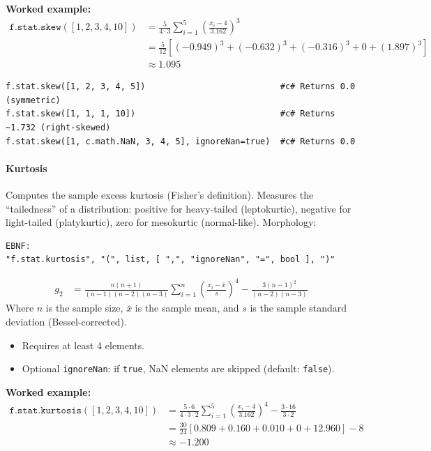 \textbf{Worked example:}
\begin{align*}
\texttt{f.stat.skew}([1, 2, 3, 4, 10]) &= \frac{5}{4 \cdot 3} \sum_{i=1}^{5} \left( \frac{x_i - 4}{3.162} \right)^3 \\
&= \frac{5}{12} \left[ (-0.949)^3 + (-0.632)^3 + (-0.316)^3 + 0 + (1.897)^3 \right] \\
&\approx 1.095
\end{align*}

\begin{verbatim}
f.stat.skew([1, 2, 3, 4, 5])                           #c# Returns 0.0 (symmetric)
f.stat.skew([1, 1, 1, 10])                             #c# Returns ~1.732 (right-skewed)
f.stat.skew([1, c.math.NaN, 3, 4, 5], ignoreNan=true)  #c# Returns 0.0
\end{verbatim}

\paragraph{Kurtosis}
Computes the sample excess kurtosis (Fisher's definition). Measures the ``tailedness'' of a distribution: positive for heavy-tailed (leptokurtic), negative for light-tailed (platykurtic), zero for mesokurtic (normal-like).
Morphology:
\begin{verbatim}
EBNF:
"f.stat.kurtosis", "(", list, [ ",", "ignoreNan", "=", bool ], ")"
\end{verbatim}
\begin{align*}
g_2 &= \frac{n(n+1)}{(n-1)(n-2)(n-3)} \sum_{i=1}^{n} \left( \frac{x_i - \bar{x}}{s} \right)^4 - \frac{3(n-1)^2}{(n-2)(n-3)}
\end{align*}
Where $n$ is the sample size, $\bar{x}$ is the sample mean, and $s$ is the sample standard deviation (Bessel-corrected).
\begin{itemize}
\item Requires at least 4 elements.
\item Optional \texttt{ignoreNan}: if \texttt{true}, NaN elements are skipped (default: \texttt{false}).
\end{itemize}

\textbf{Worked example:}
\begin{align*}
\texttt{f.stat.kurtosis}([1, 2, 3, 4, 10]) &= \frac{5 \cdot 6}{4 \cdot 3 \cdot 2} \sum_{i=1}^{5} \left( \frac{x_i - 4}{3.162} \right)^4 - \frac{3 \cdot 16}{3 \cdot 2} \\
&= \frac{30}{24} \left[ 0.809 + 0.160 + 0.010 + 0 + 12.960 \right] - 8 \\
&\approx -1.200
\end{align*}


